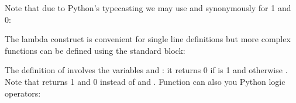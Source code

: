 \documentclass[letterpaper,10pt,english]{sphinxmanual}
\begin{document}
Note that due to Python’s typecasting we may use  and  synonymously for 1 and 0:

\begin{sphinxVerbatim}[commandchars=\\\{\}]
   
\end{sphinxVerbatim}

The lambda construct is convenient for single line definitions but more complex functions can be defined using the standard  block:

\begin{sphinxVerbatim}[commandchars=\\\{\}]
 
     
         
    
         \PYG{p}{[}\PYG{p}{]}  
\end{sphinxVerbatim}

The definition of  involves the variables  and : it returns 0 if  is 1 and otherwise .
Note that  returns 1 and 0 instead of  and .
Function can also you Python logic operators:

\begin{sphinxVerbatim}[commandchars=\\\{\}]
        
\end{sphinxVerbatim}
\end{document}
